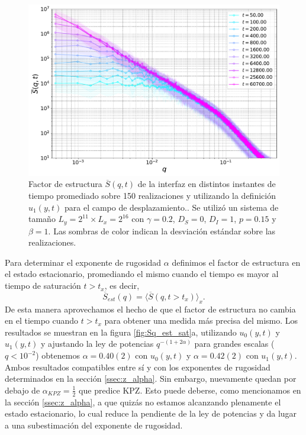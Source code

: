 \begin{figure}[!t]
    \centering
    \includegraphics[width=\imsizeL]{Sq_t.pdf}
    \caption[Factor de estructura de la interfaz de infectados]{Factor de estructura $\overline{S}(q,t)$ de la interfaz en distintos instantes de tiempo promediado sobre 150 realizaciones y utilizando la definición $u_1(y,t)$ para el campo de desplazamiento.. Se utilizó un sistema de tamaño $L_y = 2^{11}\times L_x = 2^{16}$ con $\gamma = 0.2$, $D_S = 0$, $D_I = 1$, $p = 0.15$ y $\beta = 1$. Las sombras de color indican la desviación estándar sobre las realizaciones.}
    \label{fig:Sq_t}
\end{figure}

Para determinar el exponente de rugosidad $\alpha$ definimos el factor de estructura en el estado estacionario, promediando el mismo cuando el tiempo es mayor al tiempo de saturación $t>t_x$, es decir, 
\begin{equation}
    \overline{S}_{est}(q) = \langle \overline{S}(q,t>t_x) \rangle_x.   
\end{equation}
De esta manera aprovechamos el hecho de que el factor de estructura no cambia en el tiempo cuando $t>t_x$ para obtener una medida más precisa del mismo. Los resultados se muestran en la figura \ref{fig:Sq_est_sat}a, utilizando $u_0(y,t)$ y $u_1(y,t)$ y ajustando la ley de potencias $q^{-(1+2\alpha)}$ para grandes escalas ($q<10^{-2}$) obtenemos $\alpha = 0.40(2)$ con $u_0(y,t)$ y $\alpha = 0.42(2)$ con $u_1(y,t)$. Ambos resultados compatibles entre sí y con los exponentes de rugosidad determinados en la sección \ref{ssec:z_alpha}. Sin embargo, nuevamente quedan por debajo de $\alpha_{KPZ}=\frac{1}{2}$ que predice KPZ. Esto puede deberse, como mencionamos en la sección \ref{ssec:z_alpha}, a que quizás no estamos alcanzando plenamente el estado estacionario, lo cual reduce la pendiente de la ley de potencias y da lugar a una subestimación del exponente de rugosidad.


